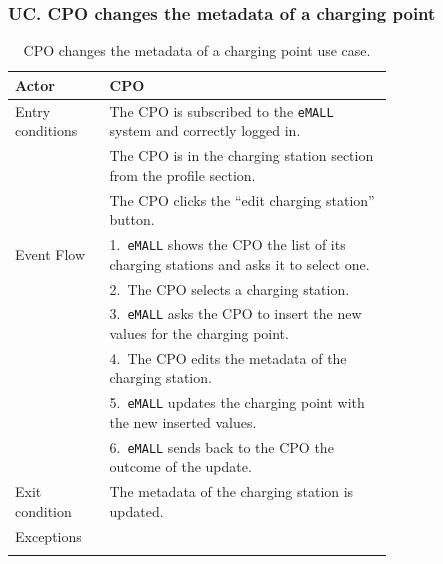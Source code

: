 \subsubsection*{UC\cuc . CPO changes the metadata of a charging point}
\begin{center}
    \begin{longtable}{lp{0.75\linewidth}}
        \hline
        Actor            & CPO                                                                                         \\
        \hline
        Entry conditions & The CPO is subscribed to the \verb|eMALL| system and correctly logged in.                   \\
        & The CPO is in the charging station section from the profile section.                        \\
        & The CPO clicks the “edit charging station” button.                                          \\
        \hline
        Event Flow       & 1.\ \verb|eMALL| shows the CPO the list of its charging stations and asks it to select one. \\
        & 2.\ The CPO selects a charging station.                                                     \\
        & 3.\ \verb|eMALL| asks the CPO to insert the new values for the charging point.              \\
        & 4.\ The CPO edits the metadata of the charging station.                                     \\
        & 5.\ \verb|eMALL| updates the charging point with the new inserted values.                   \\
        & 6.\ \verb|eMALL| sends back to the CPO the outcome of the update.                           \\
        \hline
        Exit condition   & The metadata of the charging station is updated.                                            \\
        \hline
        Exceptions       &                                                                                             \\
        \hline
        \caption{CPO changes the metadata of a charging point use case.}
        \label{tab: CPO_updates_charging_point_use_case}
    \end{longtable}


\end{center}
